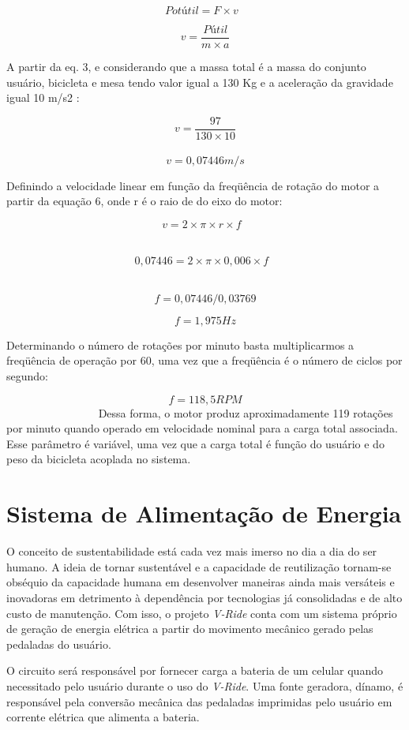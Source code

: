 \[Pot útil = F \times \textit{v  } \]

\[\textit{v} = \frac{P útil}{m\times a} \] 

A partir da eq. 3, e considerando que a massa total é a massa do conjunto usuário, bicicleta e mesa tendo valor igual a 130 Kg e a aceleração da gravidade igual 10 m/s2 : 

\[\textit{v} = \frac{97}{130 \times 10}\]  
   
\[\textit{v} = 0,07446 m/s\]

Definindo a velocidade linear em função da freqüência de rotação do motor a partir da equação 6, onde r é o raio de do eixo do motor: 

\[\textit{v} = 2 \times \pi \times r \times \textit{f  } \]       

\[0,07446 = 2 \times \pi \times 0,006 \times \textit{f  } \]   

\[\textit{f} = 0,07446/0,03769\]

\[\textit{f} = 1,975 Hz\] 

Determinando o número de rotações por minuto basta multiplicarmos a freqüência de operação por 60, uma vez que a freqüência é o número de ciclos por segundo: 

\[\textit{f}  = 118,5 RPM\]
                
Dessa forma, o motor produz aproximadamente 119 rotações por minuto quando operado em velocidade nominal para a carga total associada. Esse parâmetro é variável, uma vez que a carga total é função do usuário e do peso da bicicleta acoplada no sistema. 

\section{Sistema de Alimentação de Energia }

O conceito de sustentabilidade está cada vez mais imerso no dia a dia do ser humano. A ideia de tornar sustentável e a capacidade de reutilização tornam-se obséquio da capacidade humana em desenvolver maneiras ainda mais versáteis e inovadoras em detrimento à dependência por tecnologias já consolidadas e de alto custo de manutenção. Com isso, o projeto \textit{V-Ride} conta com um sistema próprio de geração de energia elétrica a partir do movimento mecânico gerado pelas pedaladas do usuário.

O circuito será responsável por fornecer carga a bateria de um celular quando necessitado pelo usuário durante o uso do \textit{V-Ride}. Uma fonte geradora, dínamo, é responsável pela conversão mecânica das pedaladas imprimidas pelo usuário em corrente elétrica que alimenta a bateria.

